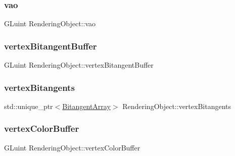 \subsubsection{\texorpdfstring{vao}{vao}}
{\footnotesize\ttfamily G\+Luint Rendering\+Object\+::vao\hspace{0.3cm}{\ttfamily [protected]}}

\hypertarget{class_rendering_object_a0c2f16211e989dd4d9d2ebbf7c027fb6}{}\label{class_rendering_object_a0c2f16211e989dd4d9d2ebbf7c027fb6}
\subsubsection{\texorpdfstring{vertex\+Bitangent\+Buffer}{vertexBitangentBuffer}}
{\footnotesize\ttfamily G\+Luint Rendering\+Object\+::vertex\+Bitangent\+Buffer\hspace{0.3cm}{\ttfamily [protected]}}

\hypertarget{class_rendering_object_a3d0ab70c5a87e4cd7fff87f3ee927678}{}\label{class_rendering_object_a3d0ab70c5a87e4cd7fff87f3ee927678}
\subsubsection{\texorpdfstring{vertex\+Bitangents}{vertexBitangents}}
{\footnotesize\ttfamily std\+::unique\+\_\+ptr$<$\hyperlink{class_rendering_object_a6c6bf305a5f0f9ce1006f374c753c856}{Bitangent\+Array}$>$ Rendering\+Object\+::vertex\+Bitangents\hspace{0.3cm}{\ttfamily [protected]}}

\hypertarget{class_rendering_object_aeb014a4ef24e2fc4665a769241660cad}{}\label{class_rendering_object_aeb014a4ef24e2fc4665a769241660cad}
\subsubsection{\texorpdfstring{vertex\+Color\+Buffer}{vertexColorBuffer}}
{\footnotesize\ttfamily G\+Luint Rendering\+Object\+::vertex\+Color\+Buffer\hspace{0.3cm}{\ttfamily [protected]}}



